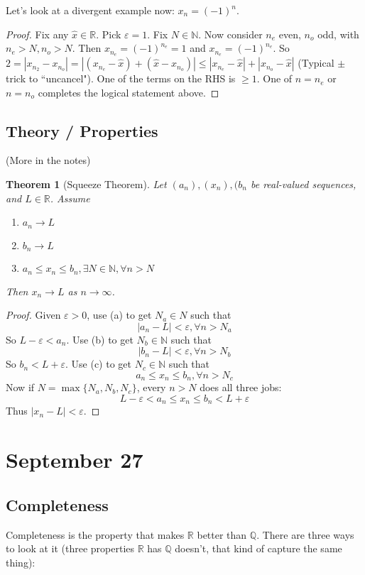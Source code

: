 \documentclass{article}
\theoremstyle{plain}
\newtheorem{theorem}{Theorem}
\theoremstyle{remark}
\newcommand{\N}{{\mathbb N}}
\newcommand{\Q}{{\mathbb Q}}
\newcommand{\R}{{\mathbb R}}
\newcommand{\ep}{{\varepsilon}}
\begin{document}
Let's look at a divergent example now:
$x_n = (-1)^n$.
\begin{proof}
	Fix any $\hat{x} \in \R$.
	Pick $\ep = 1$.
	Fix $N \in \N$.
	Now consider $n_e$ even, $n_o$ odd, with $n_e > N, n_o > N$.
	Then $x_{n_e} = (-1)^{n_e} = 1$ and $x_{n_e} = (-1)^{n_e}$.
	So $2 = |x_{n_2} - x_{n_o}| = |(x_{n_e} - \hat{x}) + (\hat{x} - x_{n_o})|
	\leq |x_{n_e} - \hat{x}| + |x_{n_o} - \hat{x}|$
	(Typical $\pm$ trick to ``uncancel").
	One of the terms on the RHS is $\geq 1$.
	One of $n=n_e$ or $n=n_o$ completes the logical statement above.
\end{proof}
\subsection{Theory / Properties}
(More in the notes)
\begin{theorem}[Squeeze Theorem]
	Let $(a_n),(x_n),(b_n$ be real-valued sequences, and $L \in \R$.
	Assume
	\begin{enumerate}
		\item $a_n \to L$
		\item $b_n \to L$
		\item $a_n \leq x_n \leq b_n, \exists N \in \N, \forall n>N$
	\end{enumerate}
	Then $x_n \to L$ as $n \to \infty$.
\end{theorem}
\begin{proof}
	Given $\ep > 0$, use (a) to get $N_a \in N$ such that
	\[
		|a_n - L| < \ep, \forall n > N_a
	\]
	So $L - \ep < a_n$.
	Use (b) to get $N_b \in \N$ such that
	\[
		|b_n -L| < \ep, \forall n > N_b
	\]
	So $b_n < L+\ep$.
	Use (c) to get $N_c \in \N$ such that
	\[
		a_n \leq x_n \leq b_n, \forall n > N_c
	\]
	Now if $N = \max\{N_a, N_b, N_c\}$,
	every $n > N$ does all three jobs:
	\[
		L - \ep < a_n \leq x_n \leq b_n < L + \ep
	\]
	Thus $|x_n - L| < \ep$.
\end{proof}

\section{September 27}
\subsection{Completeness}
Completeness is the property that makes $\R$ better than $\Q$.
There are three ways to look at it
(three properties $\R$ has $\Q$ doesn't, that kind of capture the same thing):
\end{document}
